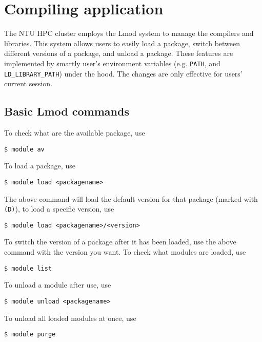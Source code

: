 \section{Compiling application}

The NTU HPC cluster employs the Lmod system to manage the compilers and libraries. This system allows users to easily load a package, switch between different versions of a package, and unload a package. These features are implemented by smartly user's environment variables (e.g. \lstinline{PATH}, and \lstinline{LD_LIBRARY_PATH}) under the hood. The changes are only effective for users' current session.

\subsection{Basic Lmod commands}

To check what are the available package, use

\begin{lstlisting}
$ module av
\end{lstlisting}

\noindent To load a package, use

\begin{lstlisting}
$ module load <packagename>
\end{lstlisting}

\noindent The above command will load the default version for that package (marked with \lstinline{(D)}), to load a specific version, use

\begin{lstlisting}
$ module load <packagename>/<version>
\end{lstlisting}

\noindent To switch the version of a package after it has been loaded, use the above command with the version you want. To check what modules are loaded, use

\begin{lstlisting}
$ module list
\end{lstlisting}

\noindent To unload a module after use, use

\begin{lstlisting}
$ module unload <packagename>
\end{lstlisting}

\noindent To unload all loaded modules at once, use

\begin{lstlisting}
$ module purge
\end{lstlisting}